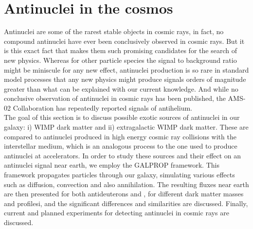 \section{Antinuclei in the cosmos}
Antinuclei are some of the rarest stable objects in cosmic rays, in fact, no compound antinuclei have ever been conclusively observed in cosmic rays. But it is this exact fact that makes them such promising candidates for the search of new physics. Whereas for other particle species the signal to background ratio might be miniscule for any new effect, antinuclei production is so rare in standard model processes that any new physics might produce signals orders of magnitude greater than what can be explained with our current knowledge. And while no conclusive observation of antinuclei in cosmic rays has been published, the AMS-02 Collaboration has repeatedly reported signals of antihelium\cite{}. \\
The goal of this section is to discuss possible exotic sources of antinuclei in our galaxy: i) WIMP dark matter and ii) extragalactic WIMP dark matter. These are compared to antinuclei produced in high energy cosmic ray collisions with the interstellar medium, which is an analogous process to the one used to produce antinuclei at accelerators. In order to study these sources and their effect on an antinuclei signal near earth, we employ the GALPROP framework. This framework propagates particles through our galaxy, simulating various effects such as diffusion, convection and also annihilation. The resulting fluxes near earth are then presented for both antideuterons and \ahe, for different dark matter masses and profilesi, and the significant differences and similarities are discussed. Finally, current and planned experiments for detecting antinuclei in cosmic rays are discussed. 

